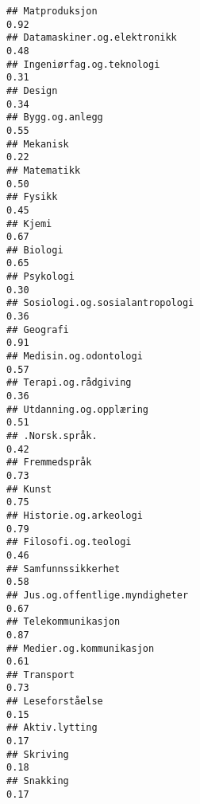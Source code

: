 \documentclass[
]{article}
\begin{document}
\begin{verbatim}
## Matproduksjon                                                                    0.92
## Datamaskiner.og.elektronikk                                                      0.48
## Ingeniørfag.og.teknologi                                                         0.31
## Design                                                                           0.34
## Bygg.og.anlegg                                                                   0.55
## Mekanisk                                                                         0.22
## Matematikk                                                                       0.50
## Fysikk                                                                           0.45
## Kjemi                                                                            0.67
## Biologi                                                                          0.65
## Psykologi                                                                        0.30
## Sosiologi.og.sosialantropologi                                                   0.36
## Geografi                                                                         0.91
## Medisin.og.odontologi                                                            0.57
## Terapi.og.rådgiving                                                              0.36
## Utdanning.og.opplæring                                                           0.51
## .Norsk.språk.                                                                    0.42
## Fremmedspråk                                                                     0.73
## Kunst                                                                            0.75
## Historie.og.arkeologi                                                            0.79
## Filosofi.og.teologi                                                              0.46
## Samfunnssikkerhet                                                                0.58
## Jus.og.offentlige.myndigheter                                                    0.67
## Telekommunikasjon                                                                0.87
## Medier.og.kommunikasjon                                                          0.61
## Transport                                                                        0.73
## Leseforståelse                                                                   0.15
## Aktiv.lytting                                                                    0.17
## Skriving                                                                         0.18
## Snakking                                                                         0.17

\end{verbatim}
\end{document}
